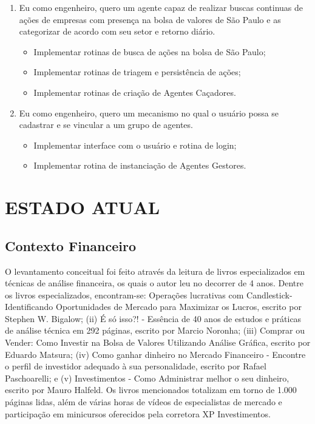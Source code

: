 \begin{enumerate}
\item Eu como engenheiro, quero um agente capaz de realizar buscas continuas de ações de empresas com presença na bolsa de valores de São Paulo e as categorizar de acordo com seu setor e retorno diário.
		\begin{itemize}
		\item Implementar rotinas de busca de ações na bolsa de São Paulo;
		\item Implementar rotinas de triagem e persistência de ações;
		\item Implementar rotinas de criação de Agentes Caçadores.
		\end{itemize}

\item Eu como engenheiro, quero um mecanismo no qual o usuário possa se cadastrar e se vincular a um grupo de agentes.
		\begin{itemize}
		\item Implementar interface com o usuário e rotina de login;
		\item Implementar rotina de instanciação de Agentes Gestores.
		\end{itemize}

\end{enumerate}

\section{ESTADO ATUAL}
\subsection{Contexto Financeiro}

O levantamento conceitual foi feito através da leitura de livros especializados em técnicas de análise financeira, os quais o autor leu no decorrer de 4 anos. Dentre os livros especializados, encontram-se: Operações lucrativas com Candlestick- Identificando Oportunidades de Mercado para Maximizar os Lucros, escrito por Stephen W. Bigalow; (ii) É só isso?! - Essência de 40 anos de estudos e práticas de análise técnica em 292 páginas, escrito por Marcio Noronha; (iii) Comprar ou Vender: Como Investir na Bolsa de Valores Utilizando Análise Gráfica, escrito por Eduardo Matsura; (iv) Como ganhar dinheiro no Mercado Financeiro - Encontre o perfil de investidor adequado à sua personalidade, escrito por Rafael Paschoarelli; e (v) Investimentos - Como Administrar melhor o seu dinheiro, escrito por Mauro Halfeld. Os livros mencionados totalizam em torno de 1.000 páginas lidas, além de várias horas de vídeos de especialistas de mercado e participação em minicursos oferecidos pela corretora XP Investimentos.

